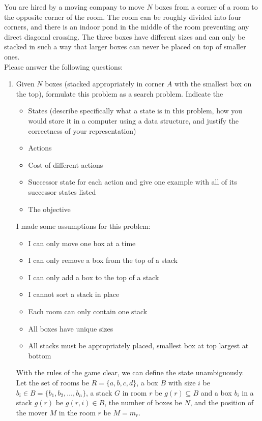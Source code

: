 \item You are hired by a moving company to move $N$ boxes from a corner of a room to the opposite
corner of the room. The room can be roughly divided into four corners, and there is an indoor
pond in the middle of the room preventing any direct diagonal crossing. The three boxes have
different sizes and can only be stacked in such a way that larger boxes can never be placed
on top of smaller ones.\\
Please answer the following questions:
\begin{enumerate}
  \item Given $N$ boxes (stacked appropriately in corner $A$ with the smallest box on the top), formulate this problem as a search problem. Indicate the
        \begin{itemize}
          \item States (describe specifically what a state is in this problem, how you would store it in a computer using a data structure, and justify the correctness of your representation)
          \item Actions
          \item Cost of different actions
          \item Successor state for each action and give one example with all of its successor states listed
          \item The objective
        \end{itemize}
        I made some assumptions for this problem:
        \begin{itemize}
          \item I can only move one box at a time
          \item I can only remove a box from the top of a stack
          \item I can only add a box to the top of a stack
          \item I cannot sort a stack in place
          \item Each room can only contain one stack
          \item All boxes have unique sizes
          \item All stacks must be appropriately placed, smallest box at top largest at bottom
        \end{itemize}
        With the rules of the game clear, we can define the state unambiguously.\\
        Let the set of rooms be $R = \{a, b, c, d\}$, a box $B$ with size $i$ be $b_i\in B=\{b_1, b_2, \ldots ,b_n\}$, a stack $G$ in room $r$ be $g(r) \subseteq B$ and a box $b_i$ in a stack $g(r)$ be $g(r,i)\in B$, the number of boxes be $N$, and the position of the mover $M$ in the room $r$ be $M = m_r$.\\

\end{enumerate}
